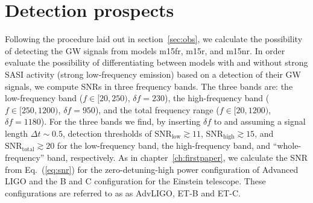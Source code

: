 \section{Detection prospects}
Following the procedure laid out in section~\ref{sec:obs}, we calculate the possibility of detecting the GW signals from models m15fr, m15r, and m15nr.
In order evaluate the possibility of differentiating between models with and without strong SASI activity (strong low-frequency emission)
based on a detection of their GW signals, we compute SNRs in three frequency bands.
The three bands are: the low-frequency band ($f \in [20,250)$, $\delta f= 230$), the
high-frequency band ($f \in [250,1200)$, $\delta f= 950$), and the total frequency range
($f \in [20,1200)$,  $\delta f= 1180$).
For the three bands we find, by inserting $\delta f$ to  and assuming a
signal length $\Delta t \sim 0.5$, detection thresholds of $\mathrm{SNR}_\mathrm{low} \gtrsim 11$, 
$\mathrm{SNR}_\mathrm{high} \gtrsim 15$, and $\mathrm{SNR}_\mathrm{total} \gtrsim 20$ for the
low-frequency band, the high-frequency band, and ``whole-frequency'' band, respectively.
As in chapter~\ref{ch:firstpaper}, we calculate the SNR from Eq.~(\ref{eq:snr}) for the zero-detuning-high power configuration
of Advanced LIGO \citep{adv_sens} and the B \citep{et_b} and C \citep{et_c} configuration for the Einstein
telescope. These configurations are referred to as as AdvLIGO, ET-B and ET-C.
